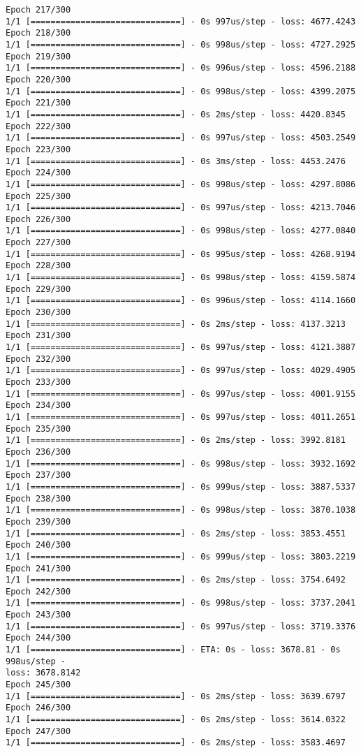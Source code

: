 \documentclass[11pt]{article}
\begin{document}
\begin{Verbatim}[commandchars=\\\{\}]
Epoch 217/300
1/1 [==============================] - 0s 997us/step - loss: 4677.4243
Epoch 218/300
1/1 [==============================] - 0s 998us/step - loss: 4727.2925
Epoch 219/300
1/1 [==============================] - 0s 996us/step - loss: 4596.2188
Epoch 220/300
1/1 [==============================] - 0s 998us/step - loss: 4399.2075
Epoch 221/300
1/1 [==============================] - 0s 2ms/step - loss: 4420.8345
Epoch 222/300
1/1 [==============================] - 0s 997us/step - loss: 4503.2549
Epoch 223/300
1/1 [==============================] - 0s 3ms/step - loss: 4453.2476
Epoch 224/300
1/1 [==============================] - 0s 998us/step - loss: 4297.8086
Epoch 225/300
1/1 [==============================] - 0s 997us/step - loss: 4213.7046
Epoch 226/300
1/1 [==============================] - 0s 998us/step - loss: 4277.0840
Epoch 227/300
1/1 [==============================] - 0s 995us/step - loss: 4268.9194
Epoch 228/300
1/1 [==============================] - 0s 998us/step - loss: 4159.5874
Epoch 229/300
1/1 [==============================] - 0s 996us/step - loss: 4114.1660
Epoch 230/300
1/1 [==============================] - 0s 2ms/step - loss: 4137.3213
Epoch 231/300
1/1 [==============================] - 0s 997us/step - loss: 4121.3887
Epoch 232/300
1/1 [==============================] - 0s 997us/step - loss: 4029.4905
Epoch 233/300
1/1 [==============================] - 0s 997us/step - loss: 4001.9155
Epoch 234/300
1/1 [==============================] - 0s 997us/step - loss: 4011.2651
Epoch 235/300
1/1 [==============================] - 0s 2ms/step - loss: 3992.8181
Epoch 236/300
1/1 [==============================] - 0s 998us/step - loss: 3932.1692
Epoch 237/300
1/1 [==============================] - 0s 999us/step - loss: 3887.5337
Epoch 238/300
1/1 [==============================] - 0s 998us/step - loss: 3870.1038
Epoch 239/300
1/1 [==============================] - 0s 2ms/step - loss: 3853.4551
Epoch 240/300
1/1 [==============================] - 0s 999us/step - loss: 3803.2219
Epoch 241/300
1/1 [==============================] - 0s 2ms/step - loss: 3754.6492
Epoch 242/300
1/1 [==============================] - 0s 998us/step - loss: 3737.2041
Epoch 243/300
1/1 [==============================] - 0s 997us/step - loss: 3719.3376
Epoch 244/300
1/1 [==============================] - ETA: 0s - loss: 3678.81 - 0s 998us/step -
loss: 3678.8142
Epoch 245/300
1/1 [==============================] - 0s 2ms/step - loss: 3639.6797
Epoch 246/300
1/1 [==============================] - 0s 2ms/step - loss: 3614.0322
Epoch 247/300
1/1 [==============================] - 0s 2ms/step - loss: 3583.4697

\end{Verbatim}
\end{document}
